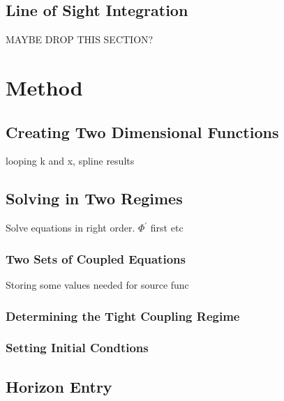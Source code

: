 \documentclass[10pt,a4paper]{article}
\begin{document}
\subsection{Line of Sight Integration}
\label{subsec:Theory/LoS Integration}
MAYBE DROP THIS SECTION?

\section{Method}
\label{sec:Method}

\subsection{Creating Two Dimensional Functions}
\label{subsec:Method/2D functions}
looping k and x, spline results

\subsection{Solving in Two Regimes}
\label{subsec:Method/Solving in two regimes}

Solve equations in right order. $\Phi^\prime$ first etc

\subsubsection{Two Sets of Coupled Equations}
\label{subsubsec:Method/Two ODE systems}
Storing some values needed for source func

\subsubsection{Determining the Tight Coupling Regime}
\label{subsubsec:Method/Determine TC}

\subsubsection{Setting Initial Condtions}
\label{subsubsec:Method/setting initial conditions}

\subsection{Horizon Entry}
\label{subsec:Method/Horizon entry}
\end{document}
